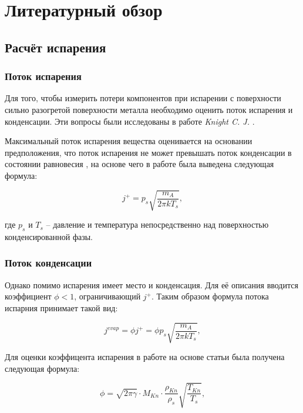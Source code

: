 \section{Литературный обзор}

\subsection{Расчёт испарения}

\subsubsection{Поток испарения}

Для того, чтобы измерить потери компонентов при испарении с поверхности сильно разогретой поверхности металла необходимо оценить поток испарения и конденсации. 
Эти вопросы были исследованы в работе \textit{Knight C. J.} \cite{knight1979theoretical}. 

Максимальный поток испарения вещества оценивается на основании предположения, что поток испарения не может превышать поток конденсации в состоянии равновесия \cite{hertz1882ueber}, на основе чего в работе \cite{langmuir1913vapor} была выведена следующая формула:

\begin{equation}
\label{eq:evap_max}
    j^+ = p_s\sqrt{\frac{m_A}{2\pi k T_s}},
\end{equation} 

\noindent
где $p_s$ и $T_s$ -- давление и температура непосредственно над поверхностью конденсированной фазы.

\subsubsection{Поток конденсации}

Однако помимо испарения имеет место и конденсация. Для её описания вводится коэффициент $\phi < 1$, ограничивающий $j^+$. Таким образом формула потока испарния принимает такой вид:

\begin{equation}
    \label{eq:evap}
    j^{evap} = \phi j^+ = \phi p_s\sqrt{\frac{m_A}{2\pi k T_s}},
\end{equation}

Для оценки коэффицента испарения в работе \cite{klassen2018simulation} на основе статьи \cite{knight1979theoretical} была получена следующая формула:

\begin{equation}
    \label{eq:evap_coeff}
    \phi = \sqrt{2\pi\gamma} \cdot M_{Kn} \cdot \frac{\rho_{Kn}}{\rho_s} \sqrt{\frac{T_{Kn}}{T_s}},
\end{equation}

